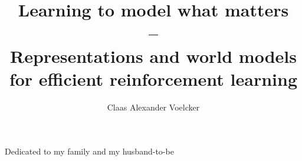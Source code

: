 \documentclass[11pt]{ut-thesis}
\author{Claas Alexander Voelcker}
\title{Learning to model what matters \\--\\ Representations and world models for efficient reinforcement learning}
\numberwithin{theorem}{subsection}
\numberwithin{assumption}{subsection}
\numberwithin{proposition}{subsection}
\numberwithin{inftheorem}{subsection}
\numberwithin{lemma}{subsection}
\numberwithin{corollary}{subsection}
\numberwithin{conjecture}{subsection}
\numberwithin{claim}{subsection}
\numberwithin{insight}{subsection}
\numberwithin{definition}{subsection}
\numberwithin{remark}{subsection}
\begin{document}
  \frontmatter
    \maketitle
    \begin{abstract}
      
    \end{abstract}
    \begin{dedication}
      Dedicated to my family and my husband-to-be
    \end{dedication}
    \begin{acknowledgements}
      
    \end{acknowledgements}
    \tableofcontents
    \listoftables
    \listoffigures
  \mainmatter
    
    
    
    
    
    
    
    
    
  \printbibliography[heading=bibintoc]
  \appendix
    
    
    
    
    
    
  \backmatter
\end{document}
